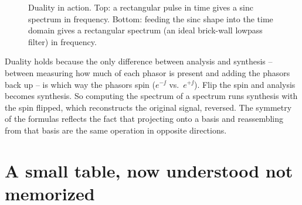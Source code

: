 \begin{example}
\begin{figure}[H]
\hfill
{}
\caption{Duality in action. Top: a rectangular pulse in time gives a sinc spectrum in frequency. Bottom: feeding the sinc shape into the time domain gives a rectangular spectrum (an ideal brick-wall lowpass filter) in frequency.}
\label{ch11:fig-duality}
\end{figure}
\end{example}

\begin{whybox}
Duality holds because the only difference between analysis and synthesis -- between measuring how much of each phasor is present and adding the
phasors back up -- is which way the phasors spin ($e^{-\jj}$ vs.\ $e^{+\jj}$).
Flip the spin and analysis becomes synthesis. So computing the spectrum of a
spectrum runs synthesis with the spin flipped, which reconstructs the
original signal, reversed. The symmetry of the formulas reflects the fact that
projecting onto a basis and reassembling from that basis are the
same operation in opposite directions.
\end{whybox}

\section{A small table, now understood not memorized}
\label{ch11:table}

